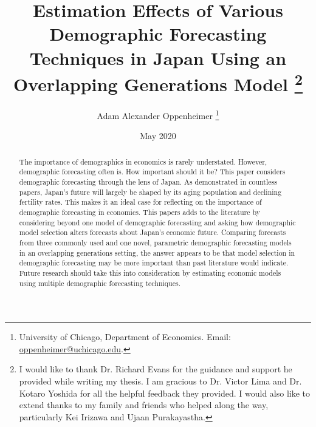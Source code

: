 \documentclass[10pt]{article}
\numberwithin{equation}{subsection}
\begin{document}
\begin{titlepage}
\title{Estimation Effects of Various Demographic Forecasting Techniques in Japan Using an Overlapping Generations Model
         \thanks{I would like to thank Dr. Richard Evans for the guidance and support he provided while writing my thesis. I am gracious to Dr. Victor Lima and Dr. Kotaro Yoshida for all the helpful feedback they provided. I would also like to extend thanks to my family and friends who helped along the way, particularly Kei Irizawa and Ujaan Purakayastha.}
      }
\author{
   Adam Alexander Oppenheimer
   \footnote{University of Chicago,
      Department of Economics. Email:
      \href{mailto:oppenheimer@uchicago.edu}
      {oppenheimer@uchicago.edu}.
   }
}
\date{May 2020 \\
   \scriptsize{}}
\maketitle
\vspace{-9mm}
\begin{abstract}
\small{The importance of demographics in economics is rarely understated. However, demographic forecasting often is. How important should it be? This paper considers demographic forecasting through the lens of Japan. As demonstrated in countless papers, Japan's future will largely be shaped by its aging population and declining fertility rates. This makes it an ideal case for reflecting on the importance of demographic forecasting in economics. This papers adds to the literature by considering beyond one model of demographic forecasting and asking how demographic model selection alters forecasts about Japan's economic future. Comparing forecasts from three commonly used and one novel, parametric demographic forecasting models in an overlapping generations setting, the answer appears to be that model selection in demographic forecasting may be more important than past literature would indicate. Future research should take this into consideration by estimating economic models using multiple demographic forecasting techniques.

}
\end{abstract}
\end{titlepage}
\end{document}
